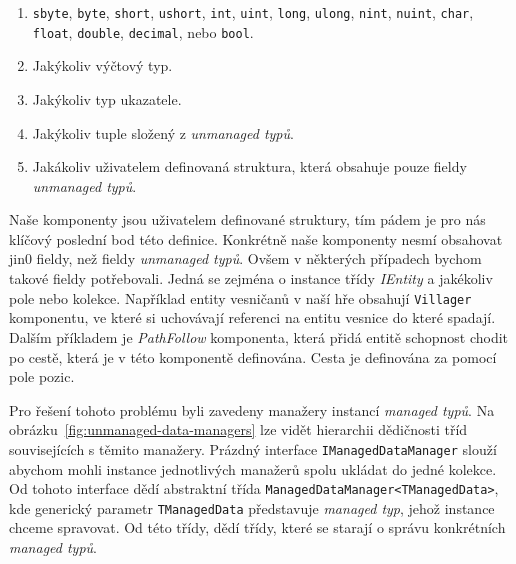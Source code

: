 \begin{enumerate}
  \item \texttt{sbyte}, \texttt{byte}, \texttt{short}, \texttt{ushort}, \texttt{int}, \texttt{uint}, \texttt{long}, \texttt{ulong}, \texttt{nint}, \texttt{nuint}, \texttt{char}, \texttt{float}, \texttt{double}, \texttt{decimal}, nebo \texttt{bool}.

  \item Jakýkoliv výčtový typ.
  
  \item Jakýkoliv typ ukazatele.

  \item Jakýkoliv tuple složený z \textit{unmanaged typů}.

  \item Jakákoliv uživatelem definovaná struktura, která obsahuje pouze fieldy \textit{unmanaged typů}.
\end{enumerate}

Naše komponenty jsou uživatelem definované struktury, tím pádem je pro nás klíčový poslední bod této definice. Konkrétně naše komponenty nesmí obsahovat jin0 fieldy, než fieldy \textit{unmanaged typů}. Ovšem v některých případech bychom takové fieldy potřebovali. Jedná se zejména o instance třídy \textit{IEntity} a jakékoliv pole nebo kolekce. Například entity vesničanů v naší hře obsahují \texttt{Villager} komponentu, ve které si uchovávají referenci na entitu vesnice do které spadají. Dalším příkladem je \textit{PathFollow} komponenta, která přidá entitě schopnost chodit po cestě, která je v této komponentě definována. Cesta je definována za pomocí pole pozic.

Pro řešení tohoto problému byli zavedeny manažery instancí \textit{managed typů}. Na obrázku~\ref{fig:unmanaged-data-managers} lze vidět hierarchii dědičnosti tříd souvisejících s těmito manažery. Prázdný interface \texttt{IManagedDataManager} slouží abychom mohli instance jednotlivých manažerů spolu ukládat do jedné kolekce. Od tohoto interface dědí abstraktní třída \texttt{ManagedDataManager<TManagedData>}, kde generický parametr \texttt{TManagedData} představuje \textit{managed typ}, jehož instance chceme spravovat. Od této třídy, dědí třídy, které se starají o správu konkrétních \textit{managed typů}.

